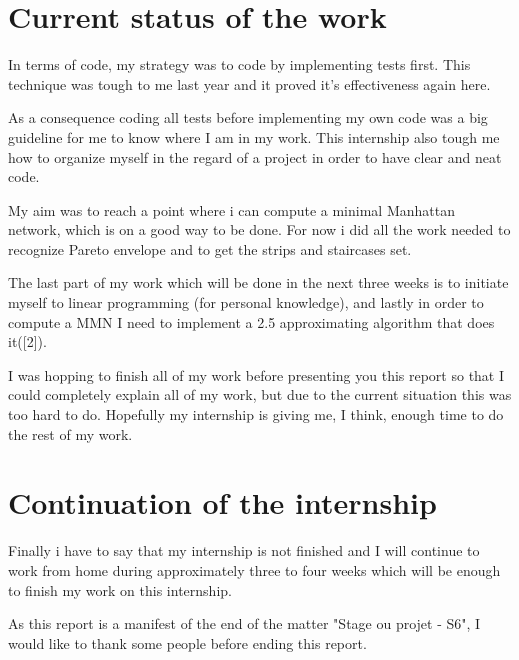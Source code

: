 \section{Current status of the work}
In terms of code, my strategy was to code by implementing tests first. This technique was tough to me last year and it proved it's effectiveness again here.

As a consequence coding all tests before implementing my own code was a big guideline for me to know where I am in my work. This internship also tough me how to organize myself in the regard of a project in order to have clear and neat code.\newline 

My aim was to reach a point where i can compute a minimal Manhattan network, which is on a good way to be done. For now i did all the work needed to recognize Pareto envelope and to get the strips and staircases set.

The last part of my work which will be done in the next three weeks is to initiate myself to linear programming (for personal knowledge), and lastly in order to compute a MMN I need to implement a 2.5 approximating algorithm that does it([2]).\newline

I was hopping to finish all of my work before presenting you this report so that I could completely explain all of my work, but due to the current situation this was too hard to do. Hopefully my internship is giving me, I think, enough time to do the rest of my work.

\section{Continuation of the internship}
Finally i have to say that my internship is not finished and I will continue to work from home during approximately three to four weeks which will be enough to finish my work on this internship.

As this report is a manifest of the end of the matter "Stage ou projet - S6", I would like to thank some people before ending this report. 